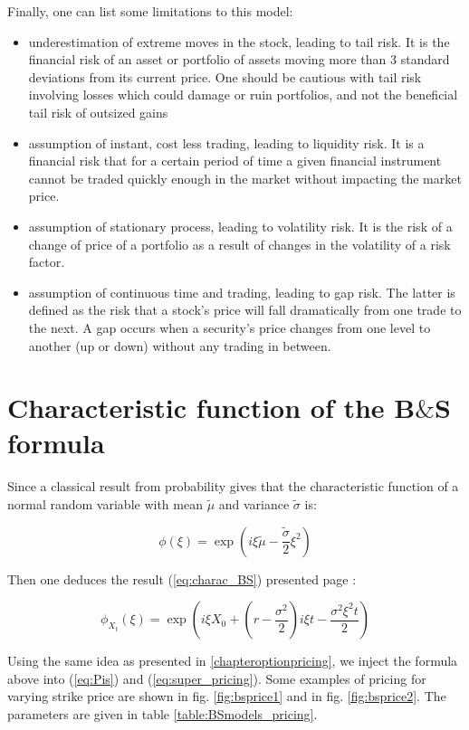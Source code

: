 Finally, one can list some limitations to this model:

\begin{itemize}
\item underestimation of extreme moves in the stock, leading to tail risk. It is the financial risk of an asset or portfolio of assets moving more than 3 standard deviations from its current price. One should be cautious with tail risk involving losses which could damage or ruin portfolios, and not the beneficial tail risk of outsized gains
\item assumption of instant, cost less trading, leading to liquidity risk. It is a financial risk that for a certain period of time a given financial instrument cannot be traded quickly enough in the market without impacting the market price.
\item assumption of stationary process, leading to volatility risk. It is the risk of a change of price of a portfolio as a result of changes in the volatility of a risk factor.
\item assumption of continuous time and trading, leading to gap risk. The latter is defined as the risk that a stock's price will fall dramatically from one trade to the next. A gap occurs when a security’s price changes from one level to another (up or down) without any trading in between.
\end{itemize}

\section{Characteristic function of the B$\&$S formula}
\label{anx:charac_BS}



Since a classical result from probability gives that the characteristic function of a normal random variable with mean $\tilde{\mu}$ and variance $\tilde{\sigma}$ is:

$$ \phi(\xi) = \exp \left ( i \xi \tilde{ \mu } - \frac {\tilde{ \sigma }} 2  \xi^2 \right ) $$

Then one deduces the result (\ref{eq:charac_BS}) presented page \pageref{eq:charac_BS}:

$$ \phi_{X_t} (\xi) = \exp \left ( i \xi X_0 + ( r - \frac{ \sigma^2}{2}
) i \xi t - \frac{\sigma ^2 \xi ^2 t}{2} \right ) $$

Using the same idea as presented in \ref{chapteroptionpricing}, we inject the formula above into (\ref{eq:Pis}) and (\ref{eq:super_pricing}). Some examples of pricing for varying strike price are shown in fig. \ref{fig:bsprice1} and in fig. \ref{fig:bsprice2}. The parameters are given in table \ref{table:BSmodels_pricing}.



